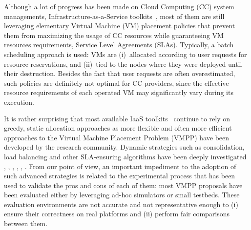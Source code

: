 \documentclass[conference]{IEEEtran}
\begin{document}
Although a lot of progress has been made on Cloud Computing (CC)
system managements, \aka Infrastructure-as-a-Service
toolkits~\cite{moreno:2012}, most of them are still leveraging
elementary Virtual Machine (VM) placement policies that prevent them
from maximizing the usage of CC resources while guaranteeing VM
resources requirements, \aka Service Level Agreements (SLAs).
Typically, a batch scheduling approach is used: VMs are (i)~allocated
according to user requests for resource reservations, and (ii)~tied to
the nodes where they were deployed until their destruction. Besides
the fact that user requests are often overestimated, such policies are
definitely not optimal for CC providers, since the effective resource
requirements of each operated VM may significantly vary during its
execution.

It is rather surprising that most available IaaS
toolkits~\cite{openstack, opennebula, cloudstack} continue to rely on
greedy, static allocation approaches as more flexible and often more
efficient approaches to the Virtual Machine Placement Problem (VMPP)
have been developed by the research community. Dynamic strategies such
as consolidation, load balancing and other SLA-ensuring algorithms
have been deeply investigated
\cite{Hermenier:2009:ECM:1508293.1508300}, \cite{feller:ccgrid12},
\cite{quesnel:cpe2012}, \cite{5935254}, \cite{5715067},
\cite{5328077}.  From our point of view, an important impediment to
the adoption of such advanced strategies is related to the
experimental process that has been used to validate the pros and cons
of each of them: most VMPP proposals have been evaluated either by
leveraging ad-hoc simulators or small testbeds. These evaluation
environments are not accurate and not representative enough to (i)
ensure their correctness on real platforms and (ii) perform fair
comparisons between them.
\end{document}
